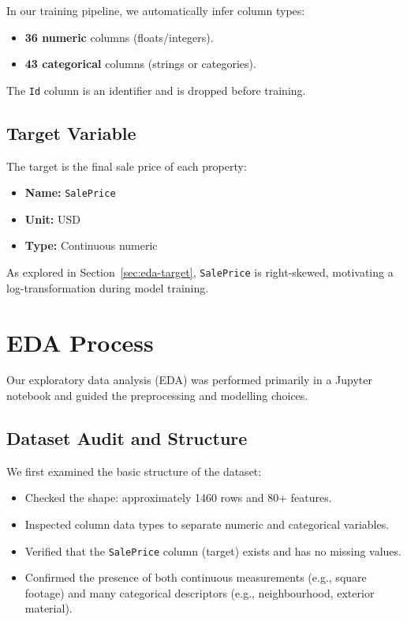 \documentclass[11pt,a4paper]{article}
\begin{document}
In our training pipeline, we automatically infer column types:

\begin{itemize}[leftmargin=*]
    \item \textbf{36 numeric} columns (floats/integers).
    \item \textbf{43 categorical} columns (strings or categories).
\end{itemize}

The \texttt{Id} column is an identifier and is dropped before training.

\subsection{Target Variable}

The target is the final sale price of each property:

\begin{itemize}[leftmargin=*]
    \item \textbf{Name:} \texttt{SalePrice}
    \item \textbf{Unit:} USD
    \item \textbf{Type:} Continuous numeric
\end{itemize}

As explored in Section~\ref{sec:eda-target}, \texttt{SalePrice} is right-skewed, motivating a log-transformation during model training.

\section{EDA Process}

Our exploratory data analysis (EDA) was performed primarily in a Jupyter notebook and guided the preprocessing and modelling choices.

\subsection{Dataset Audit and Structure}

We first examined the basic structure of the dataset:

\begin{itemize}[leftmargin=*]
    \item Checked the shape: approximately 1460 rows and 80+ features.
    \item Inspected column data types to separate numeric and categorical variables.
    \item Verified that the \texttt{SalePrice} column (target) exists and has no missing values.
    \item Confirmed the presence of both continuous measurements (e.g., square footage) and many categorical descriptors (e.g., neighbourhood, exterior material).
\end{itemize}
\end{document}
